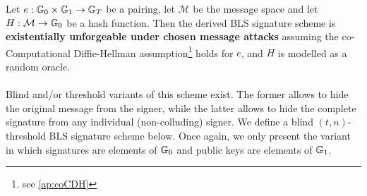 \begin{theorem} \label{th:blsforge}
	Let $e : \mathbb{G}_0 \times \mathbb{G}_1 \rightarrow \mathbb{G}_T$ be a pairing, let $\mathcal{M}$ be the message space and let $H: \mathcal{M} \rightarrow \mathbb{G}_0$ be a hash function. Then the derived BLS signature scheme is \textbf{existentially unforgeable under chosen message attacks} assuming the co-Computational Diffie-Hellman assumption\footnote{see \autoref{ap:coCDH}} holds for $e$, and $H$ is modelled as a random oracle.
\end{theorem} 

\paragraph{} Blind and/or threshold variants of this scheme exist. The former allows to hide the original message from the signer, while the latter allows to hide the complete signature from any individual (non-colluding) signer. We define a blind $(t,n)$-threshold BLS signature scheme below. Once again, we only present the variant in which signatures are elements of $\mathbb{G}_0$ and public keys are elements of $\mathbb{G}_1$. 


